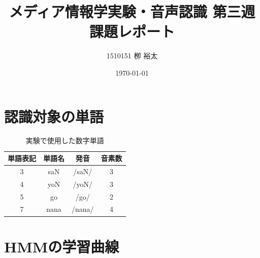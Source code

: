 \documentclass[11pt,a4paper, uplatex]{jsarticle}
\title{メディア情報学実験・音声認識 第三週課題レポート}
\author{1510151  栁 裕太}
\date{\today}
\begin{document}
\maketitle
\section{認識対象の単語}
\begin{table}[htbp]
  \begin{center}
    \caption{実験で使用した数字単語}
    \label{tb:numbers}
    \begin{tabular}{c|c|c|c}
      \hline
      単語表記 & 単語名 & 発音 & 音素数 \\ \hline \hline
      3 & saN & /saN/ & 3 \\
      4 & yoN & /yoN/ & 3 \\
      5 & go & /go/ & 2 \\
      7 & nana & /nana/ & 4 \\
      \hline
    \end{tabular}
  \end{center}
\end{table}

\section{HMMの学習曲線}
\end{document}
